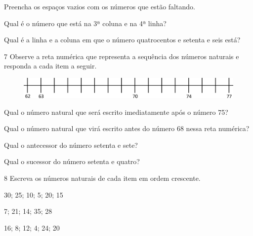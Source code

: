 \begin{escolha}
\item Preencha os espaços vazios com os números que estão faltando.

\item Qual é o número que está na 3ª coluna e na 4ª linha?

\item Qual é a linha e a coluna em que o número quatrocentos e setenta e seis está?
\end{escolha}

\vspace{-2ex}

\num{7} Observe a reta numérica que representa a sequência dos números naturais e responda a cada item a seguir.

\begin{figure}[htpb!]
\includegraphics[width=\textwidth]{./media/image31.png}
\end{figure}

\begin{escolha}
\item Qual o número natural que será escrito imediatamente após o número 75?

\item Qual o número natural que virá escrito antes do número 68 nessa reta numérica?

\item Qual o antecessor do número setenta e sete?
\reduline{76\hfill}

\item Qual o sucessor do número setenta e quatro?
\reduline{75\hfill}
\end{escolha}

\num{8} Escreva os números naturais de cada item em ordem crescente.

\begin{escolha}
\item 30; 25; 10; 5; 20; 15

\item 7; 21; 14; 35; 28

\item 16; 8; 12; 4; 24; 20
\end{escolha}


